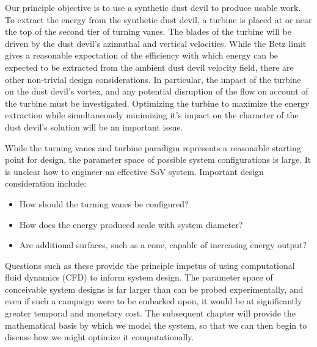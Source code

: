 
Our principle objective is to use a synthetic dust devil to produce 
usable work. To extract the energy from the synthetic dust
devil, a turbine is placed 
at or near the top of the second tier of turning vanes. 
The blades of the turbine will be driven by the dust devil's azimuthal
and vertical velocities. While the Betz limit\cite{betz} gives a reasonable
expectation of the efficiency with which energy can be expected to be
extracted from the ambient dust devil velocity field, there are other
non-trivial design considerations. In particular, the impact of the
turbine on the dust devil's vortex, and any potential disruption of the
flow on account of the turbine must be investigated. Optimizing the
turbine to maximize the energy extraction while simultaneously
minimizing it's impact on the character of the dust devil's solution
will be an important issue.

While the turning vanes and turbine  
paradigm represents a reasonable starting point for design, the
parameter space of possible system configurations is large. It is
unclear how to engineer an effective SoV system. Important design
consideration include: 
\begin{itemize}
  \item How should the turning vanes be configured?
  \item How does the energy produced scale with system diameter?
  \item Are additional surfaces, such as a cone, capable of increasing energy output?
\end{itemize}

Questions such as these provide the principle impetus of using
computational fluid dynamics (CFD) to inform system design. The
parameter space of conceivable system designs is far larger than can be
probed experimentally, and even if such a campaign were to be embarked
upon, it would be at significantly greater temporal and monetary
cost. The subsequent chapter will provide the mathematical basis by which
we model the system, so that we can then begin to discuss how we might
optimize it computationally.  


